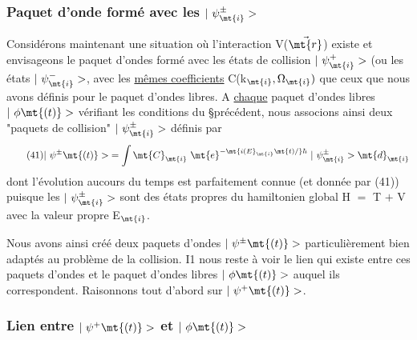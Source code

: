 {{{\subsubsection{Paquet d'onde formé avec les $|\ \psi_\mt{i}^\pm>$}%
Considérons maintenant une situation où l'interaction V($\vec{\mt{r}}$)
existe et envisageons le paquet d'ondes formé avec les états de collision
$|\ \psi_\mt{i}^+>$ (ou les états $|\ \psi_\mt{i}^->$, avec les \ul{mêmes coefficients}
C({k$_\mt{i},\Omega_\mt{i})$ que
ceux que nous avons définis pour le paquet d'ondes libres. A \ul{chaque} paquet
d'ondes libres $|\ \phi\mt{(t)}>$ vérifiant les conditions du \S précédent, nous associons
ainsi deux "paquets de collision" $|\ \psi_\mt{i}^\pm>$} définis par
\[
\tag{41}|\ \psi^\pm\mt{(t)}>\;=
\int\mt{C}_\mt{i}\ \mt{e}^{-\mt{i(E}_\mt{i}\mt{t)/}\hbar}\ |\ \psi_\mt{i}^\pm>\mt{d}_\mt{i}
\]
dont l'évolution aucours du temps est parfaitement connue (et donnée par
(41)) puisque les $|\ \psi_\mt{i}^\pm>$ sont des états propres du hamiltonien global
H $=$ T $+$ V avec la valeur propre E$_\mt{i}$.

Nous avons ainsi créé deux paquets d'ondes $|\ \psi^\pm\mt{(t)}>$ particulièrement
bien adaptés au problème de la collision. I1 nous reste à voir
le lien qui existe entre ces paquets d'ondes et le paquet d'ondes libres
$|\ \phi\mt{(t)}>$ auquel ils correspondent. Raisonnons tout d'abord sur $|\ \psi^+\mt{(t)}>$.
 
\subsubsection{Lien entre $|\ \psi^+\mt{(t)}>$ et $|\ \phi\mt{(t)}>$}%

}}}
